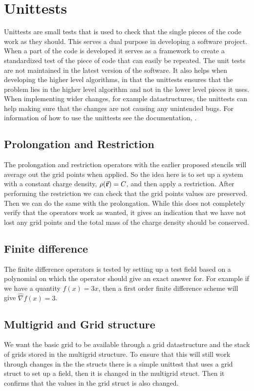 \section{Unittests}
\label{sec:unittests}
Unittests are small tests that is used to check that the single pieces of the code
work as they should. This serves a dual purpose in developing a software project.
When a part of the code is developed it serves as a framework to create a standardized
test of the piece of code that can easily be repeated. The unit tests are not maintained
in the latest version of the software.
It also helps when developing the higher level algorithms, in that the unittests ensures
that the problem lies in the higher level algorithm and not in the lower level pieces
it uses. When implementing wider changes, for example datastructures, the unittests
can help making sure that the changes are not causing any unintended bugs. For
information of how to use the unittests see the documentation, \cite{documentation}.

\subsection{Prolongation and Restriction}
	The prolongation and restriction operators with the earlier proposed stencils
  will average out the grid points when applied. So the idea here is to set up a
  system with a constant charge density, \(\rho(\va{r}) = C\), and then apply a
  restriction. After performing the restriction we can check that the grid points
  values are preserved. Then we can do the same with the prolongation. While this
  does not completely verify that the operators work as wanted, it gives an indication
	that we have not lost any grid points and the total mass of the charge density should be conserved.

\subsection{Finite difference}
  The finite difference operators is tested by setting up a test
  field based on a polynomial on which the operator should give an exact answer for.
  For example if we have a quantity \(f(x) = 3x\), then a first order finite difference
  scheme will give \(\hat{\nabla}f(x) = 3\).

\subsection{Multigrid and Grid structure}
  We want the basic grid to be available through a grid datastructure and the stack
  of grids stored in the multigrid structure. To ensure that this will still work
  through changes in the the structs there is a simple unittest that uses a grid struct
  to set up a field, then it is changed in the multigrid struct. Then it confirms
  that the values in the grid struct is also changed.

